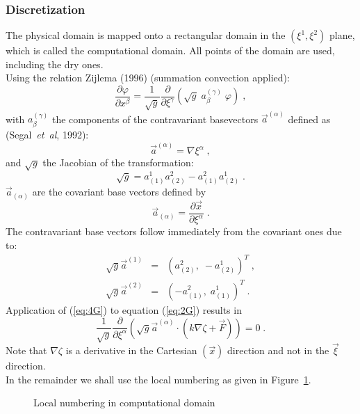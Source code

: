 \documentclass[12pt]{book}
\begin{document}
\subsubsection{Discretization}
\label{subsec1.2G}
%
The physical domain is mapped onto a rectangular domain in the $(\xi^{1},
\xi^{2})$ plane, which is called the computational domain. All points of
the domain are used, including the dry ones.\\[2ex]
Using the relation Zijlema (1996) (summation convection applied):
\begin{equation}
\frac{\partial \varphi}{\partial x^{\beta}} = \frac{1}{\sqrt{g}}
\frac{\partial}{\partial\xi^{\gamma}}(\sqrt{g}\;  a^{(\gamma)}_{\beta}\;
\varphi)\;,
\label{eq:4G}
\end{equation}
with $a^{(\gamma)}_{\beta}$ the components of the contravariant basevectors
$\vec{a}^{(\alpha)}$ defined as (Segal~{\it et~al}, 1992):
\begin{equation}
\vec{a}^{(\alpha)} = \nabla \xi^{\alpha}\;,
\label{eq:5G}
\end{equation}
and $\sqrt{g}$ the Jacobian of the transformation:
\begin{equation}
\sqrt{g} = a^{1}_{(1)} a^{2}_{(2)} - a^{2}_{(1)}a^{1}_{(2)}\;.
\label{eq:6G}
\end{equation}
$\vec{a}_{(\alpha)}$ are the covariant base vectors defined by
\begin{equation}
\vec{a}_{(\alpha)} = \frac{\partial \vec{x}}{\partial \xi^{\alpha}} \; .
\label{eq:7G}
\end{equation}
The contravariant base vectors follow immediately from the covariant ones
due to:
\begin{eqnarray}
\sqrt{g}\vec{a}^{(1)}&=&(a^{2}_{(2)}, \; -a^{1}_{(2)})^{T}\;,\label{eq:8aG}\\
\sqrt{g}\vec{a}^{(2)}&=&(-a^{2}_{(1)}, \; a^{1}_{(1)})^{T}\;.\label{eq:8bG}
\end{eqnarray}
Application of (\ref{eq:4G}) to equation (\ref{eq:2G}) results in
\begin{equation}
\frac{1}{\sqrt{g}} \frac{\partial}{\partial \xi^{\alpha}}(\sqrt{g}
\vec{a}^{(\alpha)} \cdot (k \nabla \zeta + \vec{F})) = 0\;.
\label{eq:9G}
\end{equation}
Note that $\nabla \zeta$ is a derivative in the Cartesian $(\vec{x})$
direction and not in the $\vec{\xi}$ direction.\\[2ex]
In the remainder we shall use the local numbering as given in
Figure~\ref{fig1G}.
\begin{figure}[htb]
\centerline{}
\caption{Local numbering in computational domain}
\label{fig1G}
\end{figure}
\end{document}
